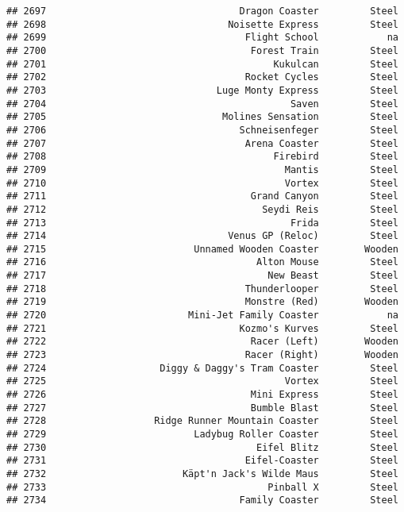 \documentclass[
]{article}
\begin{document}
\begin{verbatim}
## 2697                                  Dragon Coaster         Steel
## 2698                                Noisette Express         Steel
## 2699                                   Flight School            na
## 2700                                    Forest Train         Steel
## 2701                                        Kukulcan         Steel
## 2702                                   Rocket Cycles         Steel
## 2703                              Luge Monty Express         Steel
## 2704                                           Saven         Steel
## 2705                               Molines Sensation         Steel
## 2706                                  Schneisenfeger         Steel
## 2707                                   Arena Coaster         Steel
## 2708                                        Firebird         Steel
## 2709                                          Mantis         Steel
## 2710                                          Vortex         Steel
## 2711                                    Grand Canyon         Steel
## 2712                                      Seydi Reis         Steel
## 2713                                           Frida         Steel
## 2714                                Venus GP (Reloc)         Steel
## 2715                          Unnamed Wooden Coaster        Wooden
## 2716                                     Alton Mouse         Steel
## 2717                                       New Beast         Steel
## 2718                                   Thunderlooper         Steel
## 2719                                   Monstre (Red)        Wooden
## 2720                         Mini-Jet Family Coaster            na
## 2721                                  Kozmo's Kurves         Steel
## 2722                                    Racer (Left)        Wooden
## 2723                                   Racer (Right)        Wooden
## 2724                    Diggy & Daggy's Tram Coaster         Steel
## 2725                                          Vortex         Steel
## 2726                                    Mini Express         Steel
## 2727                                    Bumble Blast         Steel
## 2728                   Ridge Runner Mountain Coaster         Steel
## 2729                          Ladybug Roller Coaster         Steel
## 2730                                     Eifel Blitz         Steel
## 2731                                   Eifel-Coaster         Steel
## 2732                        Käpt'n Jack's Wilde Maus         Steel
## 2733                                       Pinball X         Steel
## 2734                                  Family Coaster         Steel

\end{verbatim}
\end{document}
